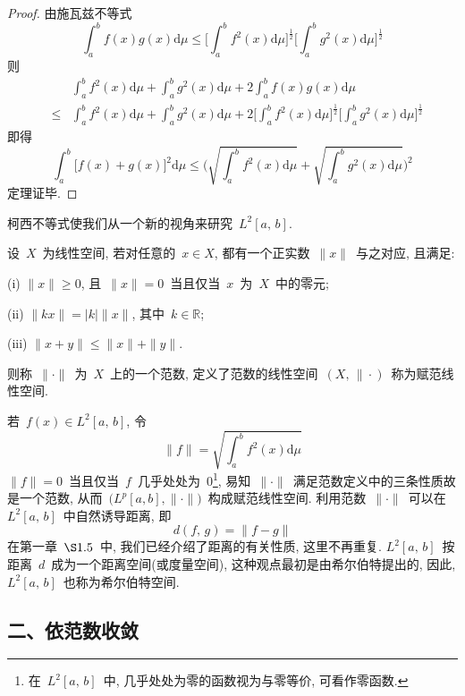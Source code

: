 \begin{proof}
由施瓦兹不等式
\[
\int_{a}^{b}f(x)g(x)\mathrm{d}\mu \leqslant \Big[\int_{a}^{b}f^{2}(x)\mathrm{d}\mu\Big]^{\frac{1}{2}}\Big[\int_{a}^{b}g^{2}(x)\mathrm{d}\mu\Big]^{\frac{1}{2}}
\]
则
\begin{eqnarray*}
&& \int_{a}^{b}f^{2}(x)\mathrm{d}\mu+\int_{a}^{b}g^{2}(x)\mathrm{d}\mu+2\int_{a}^{b}f(x)g(x)\mathrm{d}\mu \\
&\leqslant& \int_{a}^{b}f^{2}(x)\mathrm{d}\mu+\int_{a}^{b}g^{2}(x)\mathrm{d}\mu+2\Big[\int_{a}^{b}f^{2}(x)\mathrm{d}\mu\Big]^{\frac{1}{2}}
\Big[\int_{a}^{b}g^{2}(x)\mathrm{d}\mu\Big]^{\frac{1}{2}}
\end{eqnarray*}
即得
\[
\int_{a}^{b}\big[f(x)+g(x)\big]^{2}\mathrm{d}\mu\leqslant \Big(\sqrt{\textstyle{\int_{a}^{b}f^{2}(x)\mathrm{d}\mu}}+\sqrt{\textstyle{\int_{a}^{b}g^{2}(x)\mathrm{d}\mu}}\Big)^{2}
\]
定理证毕.
\end{proof}

柯西不等式使我们从一个新的视角来研究~$L^2[a,\,b]$.

\begin{Definition}
设~$X$~为线性空间, 若对任意的~$x \in X$, 都有一个正实数~$\|x\|$~与之对应, 且满足:

(i) $\|x\|\geqslant 0$, 且~$\|x\|= 0$~当且仅当~$x$~为~$X$~中的零元;

(ii) $\|kx\|=|k|\|x\|$, 其中~$k\in \mathbb{R}$;

(iii) $\|x+y\|\leqslant \|x\|+\|y\|$.

\noindent 则称~$\|\cdot\|$~为~$X$~上的一个范数, 定义了范数的线性空间~$(X,\,\|\cdot)$~称为赋范线性空间.
\end{Definition}

\setcounter{footnote}{0}

若~$f(x)\in L^2[a,\,b]$, 令
\[
\|f\|=\sqrt{\textstyle{\int_{a}^{b}f^{2}(x)\mathrm{d}\mu}}
\]
$\|f\|=0$~当且仅当~$f$~几乎处处为~0\footnote{在~$L^2[a,\,b]$~中, 几乎处处为零的函数视为与零等价, 可看作零函数.}, 易知~$\|\cdot\|$~满足范数定义中的三条性质故是一个范数, 从而~$\big(L^p[a,b],\|\cdot\|\big)$~构成赋范线性空间. 利用范数~$\|\cdot\|$~可以在~$L^2[a,\,b]$~中自然诱导距离, 即
\[
d(f,\,g)=\|f-g\|
\]
在第一章~$\S1.5$~中, 我们已经介绍了距离的有关性质, 这里不再重复. $L^2[a,\,b]$~按距离~$d$~成为一个距离空间(或度量空间), 这种观点最初是由希尔伯特提出的, 因此, $L^2[a,\,b]$~也称为希尔伯特空间.

\medskip

\subsection*{二、依范数收敛}

